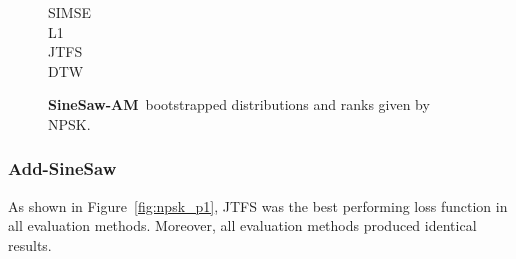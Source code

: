 \documentclass[lettersize,journal]{IEEEtran}
\newcommand{\AddSineSaw}{\textbf{Add-SineSaw}}
\newcommand{\FMMod}{\textbf{SineSaw-AM}}
\begin{document}
\begin{figure}[htbp]
    \centering
    \begin{minipage}{0.03\textwidth}
        \footnotesize
        \raggedleft
        \vspace{-.2cm}
        SIMSE\\[0.6cm]
        L1\\[0.65cm]
        JTFS\\[0.65cm]
        DTW
    \end{minipage}%
    \begin{minipage}{0.95\textwidth}
        \centering
        \hspace{0.005\textwidth} %
        \hspace{0.005\textwidth} %
    \end{minipage}
    \vspace{-0.5em}
    \caption{\FMMod~bootstrapped distributions and ranks given by NPSK.}
    \label{fig:npsk_p3}
\end{figure}

\subsubsection{\AddSineSaw}
As shown in Figure~\ref{fig:npsk_p1}, JTFS was the best performing loss function in all evaluation methods. Moreover, all evaluation methods produced identical results. 
\end{document}

